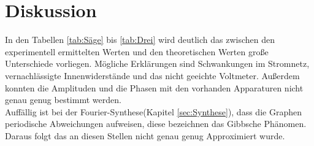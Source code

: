 \section{Diskussion}
\label{sec:Diskussion}

In den Tabellen \ref{tab:Säge} bis \ref{tab:Drei} wird deutlich das zwischen den experimentell ermittelten Werten und den theoretischen Werten große Unterschiede vorliegen. Mögliche Erklärungen sind Schwankungen im Stromnetz, vernachlässigte Innenwiderstände und das nicht geeichte Voltmeter. Außerdem konnten die Amplituden und die Phasen mit den vorhanden Apparaturen nicht genau genug bestimmt werden. \\
Auffällig ist bei der Fourier-Synthese(Kapitel \ref{sec:Synthese}), dass die Graphen periodische Abweichungen aufweisen, diese bezeichnen das Gibbsche Phänomen. Daraus folgt das an diesen Stellen nicht genau genug Approximiert wurde.
